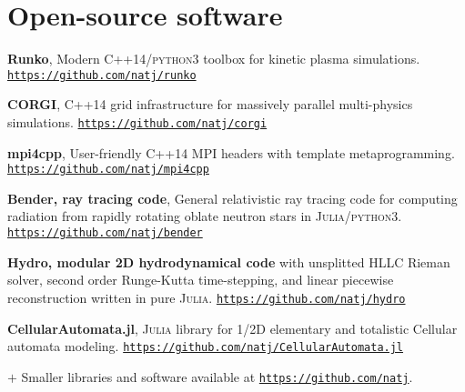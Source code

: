 \documentclass[letterpaper, onecolumn, 11pt]{article}
\begin{document}
%


\vspace{1cm}
\section*{Open-source software}
\vspace{-1cm}

\begin{thebibliography}{6}
    \textbf{Runko}, 
\newblock Modern \textsc{C++}14/\textsc{python3} toolbox for kinetic plasma simulations. 
 \newblock \mbox{\href{https://github.com/natj/Runko}{\nolinkurl{https://github.com/natj/runko}}}

    \textbf{CORGI}, 
 \newblock \textsc{C++}14 grid infrastructure for massively parallel multi-physics simulations. 
 \newblock \mbox{\href{https://github.com/natj/corgi}{\nolinkurl{https://github.com/natj/corgi}}} 

    \textbf{mpi4cpp}, 
\newblock User-friendly \textsc{C++}14 MPI headers with template metaprogramming. 
 \newblock \mbox{\href{https://github.com/natj/mpi4cpp}{\nolinkurl{https://github.com/natj/mpi4cpp}}}

    \textbf{Bender, ray tracing code}, 
        \newblock General relativistic ray tracing code for computing radiation from rapidly rotating oblate neutron stars in \textsc{Julia}/\textsc{python3}. 
 \newblock \mbox{\href{https://github.com/natj/bender}{\nolinkurl{https://github.com/natj/bender}}}

    \textbf{Hydro, modular 2D hydrodynamical code} 
\newblock with unsplitted HLLC Rieman solver, second order Runge-Kutta time-stepping, and linear piecewise reconstruction written in pure \textsc{Julia}.
 \newblock \mbox{\href{https://github.com/natj/hydro}{\nolinkurl{https://github.com/natj/hydro}}}

    \textbf{CellularAutomata.jl}, 
\newblock \textsc{Julia} library for 1/2D elementary and totalistic Cellular automata modeling. 
\newblock \mbox{\href{https://github.com/natj/CellularAutomata.jl}{\nolinkurl{https://github.com/natj/CellularAutomata.jl}}}
\end{thebibliography}

\noindent
$+$ Smaller libraries and software available at \mbox{\href{https://github.com/natj}{\nolinkurl{https://github.com/natj}}}.
\end{document}
